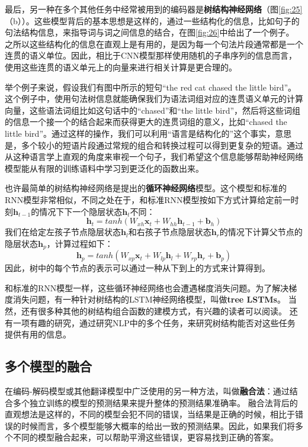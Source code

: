 \documentclass[10pt,a4paper]{ctexart}
\begin{document}
最后，另一种在多个其他任务中经常被用到的编码器是\textbf{树结构神经网络}（\cite{pollack1990recursive,socher2011parsing}图\ref{fig:25}（b））。这些模型背后的基本思想是这样的，通过一些结构化的信息，比如句子的句法结构信息，来指导词与词之间信息的结合，在图\ref{fig:26}中给出了一个例子。
之所以这些结构化的信息在直观上是有用的，是因为每一个句法片段通常都是一个连贯的语义单位。因此，相比于CNN模型那样使用随机的子串序列的信息而言，使用这些连贯的语义单元上的向量来进行相关计算是更合理的。

举个例子来说，假设我们有图中所示的短句“the red cat chased the little bird”。这个例子中，使用句法树信息就能确保我们为语法词组对应的连贯语义单元的计算向量，这些语法词组比如这句话中的“chased”和“the little bird”，然后将这些词组的信息一个接一个的结合起来而获得更大的连贯词组的意义，比如“chased the little bird”。通过这样的操作，我们可以利用“语言是结构化的”这个事实，意思是，多个较小的短语片段通过常规的组合和转换过程可以得到更复杂的短语\cite{szabo2010compositionality}。通过从这种语言学上直观的角度来审视一个句子，我们希望这个信息能够帮助神经网络模型能从有限的训练语料中学习到更泛化的函数出来。

也许最简单的树结构神经网络是\cite{socher2011parsing}提出的\textbf{循环神经网络}模型。这个模型和标准的RNN模型非常相似，不同之处在于，和标准RNN模型按如下方式计算给定前一时刻$\textbf{h}_{t-1}$的情况下下一个隐层状态$\textbf{h}_t$不同：
\[
 \textbf{h}_t = tanh(W_{xh}\textbf{x}_t + W_{hh}\textbf{h}_{t-1} + \textbf{b}_h)
\]
我们在给定左孩子节点隐层状态$\textbf{h}_l$和右孩子节点隐层状态$\textbf{h}_r$的情况下计算父节点的隐层状态$\textbf{h}_p$，计算过程如下：
\[
 \textbf{h}_p = tanh(W_{xp}\textbf{x}_t + W_{lp}\textbf{h}_l + W_{rp}\textbf{h}_r + \textbf{b}_p)
\]
因此，树中的每个节点的表示可以通过一种从下到上的方式来计算得到。

和标准的RNN模型一样，这些循环神经网络也会遭遇梯度消失问题。为了解决梯度消失问题，有一种针对树结构的LSTM神经网络模型，叫做\textbf{tree LSTMs}\cite{tai2015improved}。
当然，还有很多种其他的树结构组合函数的建模方式，有兴趣的读者可以阅读\cite{socher2013parsing,dyer2015transition,dyer2016recurrent}。
还有一项有趣的研究\cite{li2015tree}，通过研究NLP中的多个任务，来研究树结构能否对这些任务提供有用的信息。

\subsection{多个模型的融合}
在编码-解码模型或其他翻译模型中广泛使用的另一种方法，叫做\textbf{融合法}：通过结合多个独立训练的模型的预测结果来提升整体的预测结果准确率。
融合法背后的直观想法是这样的，不同的模型会犯不同的错误，当结果是正确的时候，相比于错误的时候而言，多个模型能够大概率的给出一致的预测结果。因此，如果我们将多个不同的模型融合起来，可以帮助平滑这些错误，更容易找到正确的答案。
\end{document}
